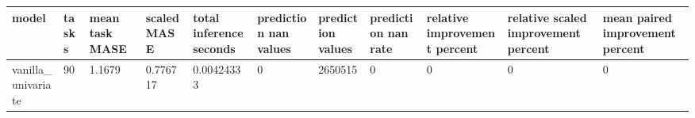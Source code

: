 \begin{tabular}{lllllllllll}
\toprule
model & tasks & mean task MASE & scaled MASE & total inference seconds & prediction nan values & prediction values & prediction nan rate & relative improvement percent & relative scaled improvement percent & mean paired improvement percent \\
\midrule
vanilla\_univariate & 90 & 1.1679 & 0.776717 & 0.00424333 & 0 & 2650515 & 0 & 0 & 0 & 0 \\
\bottomrule
\end{tabular}
